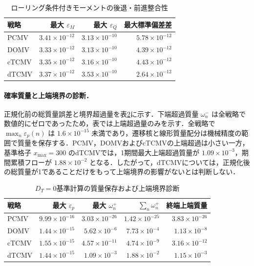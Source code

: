 \documentclass[10pt,a4paper]{article}
\theoremstyle{plain}
\theoremstyle{definition}
\begin{document}
\begin{table}[H]
\centering
\caption{ローリング条件付きモーメントの後退・前進整合性}
\label{tab:rolling-validation-D0}
\begin{tabular}{lrrr}
\toprule
戦略 & 最大 $\varepsilon_M$ & 最大 $\varepsilon_Q$ & 最大標準偏差差 \\
\midrule
PCMV & $3.41\times10^{-12}$ & $3.13\times10^{-10}$ & $5.78\times10^{-12}$ \\
DOMV & $3.33\times10^{-12}$ & $3.13\times10^{-10}$ & $4.39\times10^{-12}$ \\
cTCMV & $3.35\times10^{-12}$ & $3.16\times10^{-10}$ & $4.43\times10^{-12}$ \\
dTCMV & $3.37\times10^{-12}$ & $3.53\times10^{-10}$ & $2.64\times10^{-12}$ \\
\bottomrule
\end{tabular}

\end{table}

\paragraph{確率質量と上端境界の診断．}
正規化前の総質量誤差と境界超過量を表\ref{tab:mass-truncation-D0}に示す．下端超過質量 $\omega_n^{-}$ は全戦略で数値的にゼロであったため，表では上端超過量のみを示す．全戦略で $\max_n\varepsilon_p(n)$ は $1.6\times10^{-15}$ 未満であり，遷移核と線形質量配分は機械精度の範囲で質量を保存する．PCMV，DOMVおよびcTCMVの上端超過は小さい一方，基準格子 $x_{\max}=300$ のdTCMVでは，1期間最大上端超過質量が $1.09\times10^{-3}$，期間累積フローが $1.88\times10^{-2}$ となる．したがって，dTCMVについては，正規化後の総質量が1であることだけをもって上端境界の影響がないとは判断しない．

\begin{table}[H]
\centering
\small
\caption{$D_T=0$基準計算の質量保存および上端境界診断}
\label{tab:mass-truncation-D0}
\begin{tabular}{lrrrr}
\toprule
戦略 & 最大 $\varepsilon_p$ & 最大 $\omega_n^+$ & $\sum_n\omega_n^+$ & 終端上端質量 \\
\midrule
PCMV  & $9.99\times10^{-16}$ & $3.03\times10^{-26}$ & $1.42\times10^{-25}$ & $3.83\times10^{-26}$ \\
DOMV  & $1.44\times10^{-15}$ & $5.62\times10^{-6}$  & $7.73\times10^{-4}$  & $1.13\times10^{-8}$ \\
cTCMV & $1.55\times10^{-15}$ & $4.57\times10^{-11}$ & $4.74\times10^{-9}$  & $3.16\times10^{-12}$ \\
dTCMV & $1.44\times10^{-15}$ & $1.09\times10^{-3}$  & $1.88\times10^{-2}$  & $1.15\times10^{-3}$ \\
\bottomrule
\end{tabular}
\end{table}
\end{document}
